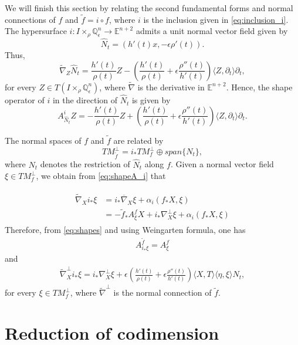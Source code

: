 \documentclass[11pt,a4paper]{article}
\numberwithin{equation}{section}
\newcommand{\Q}{\mathbb{Q}}
\newcommand{\E}{\mathbb{E}}
\newcommand{\e}{\epsilon}
\newcommand{\IWP}{I\times_{\rho}\Q^n_{\epsilon}}
\newcommand{\co}{\colon}
\newcommand{\dt}{\partial_t}
\newcommand{\np}{\nabla^\perp}
\newcommand{\nb}{\overline\nabla}
\newcommand{\nt}{\widetilde\nabla}
\begin{document}

We will finish this section by relating the second fundamental forms and normal connections of $f$ and $\tilde f=i\circ f$, where $i$ is the inclusion given in \eqref{eq:inclusion_i}. The hypersurface $i\co\IWP\to\E^{n+2}$ admits a unit normal vector field given by
\[
\hat N_t = (h'(t)x,-\e\rho'(t)).
\]
Thus,
\[
\widetilde\nabla_Z\hat N_t = \frac{h'(t)}{\rho(t)}Z - 
\left(\frac{h'(t)}{\rho(t)} + \e\frac{\rho''(t)}{h'(t)}
\right)\langle Z,\dt\rangle\dt,
\]
for every $Z\in T(\IWP)$, where $\widetilde\nabla$ is the derivative in $\E^{n+2}$. Hence, the shape operator of $i$ in the direction of $\hat N_t$ is given by
\begin{equation} \label{eq:shapeA_i}
A^i_{\hat N_t}Z = -\frac{h'(t)}{\rho(t)}Z +
\left(\frac{h'(t)}{\rho(t)} + \e\frac{\rho''(t)}{h'(t)}
\right)\langle Z,\dt\rangle\dt.
\end{equation}

The normal spaces of $f$ and $\widetilde{f}$ are related by
\[
TM^\perp_{\tilde f} = i_\ast TM^\perp_f\oplus span\{N_t\},
\]
where $N_t$ denotes the restriction of $\hat N_t$ along $f$. Given a normal vector field $\xi\in TM^\perp_f$, we obtain from \eqref{eq:shapeA_i} that 

\begin{eqnarray} \label{eq:shapes}
\begin{aligned}
\nt_Xi_\ast\xi &= i_\ast\nb_X\xi + \alpha_i(f_\ast X,\xi) \\
& = -\tilde{f}_\ast A^f_{\xi}X + i_\ast\np_X\xi+ \alpha_i(f_\ast X,\xi)
\end{aligned}
\end{eqnarray}
Therefore, from \eqref{eq:shapes} and using Weingarten formula, one has
\begin{eqnarray} \label{eq:A^fA^tf}
A^{\tilde f}_{i_{\ast}\xi}=A^f_{\xi}
\end{eqnarray}
and
\begin{eqnarray} \label{eq:nabtilperp}
\widetilde{\nabla}^{\perp}_{X} i_{\ast} \xi=  i_\ast\np_X\xi+ \e\left(\frac{h'(t)}{\rho(t)}+\e\frac{\rho''(t)}{h'(t)}\right)\langle X, T\rangle \langle\eta,\xi\rangle N_t,
\end{eqnarray}
for every $\xi\in TM^\perp_f$, where $\widetilde{\nabla}^{\perp}$ is the normal connection of $\tilde{f}$. 


\section{Reduction of codimension} \label{sec:CodimReduc}
\end{document}
